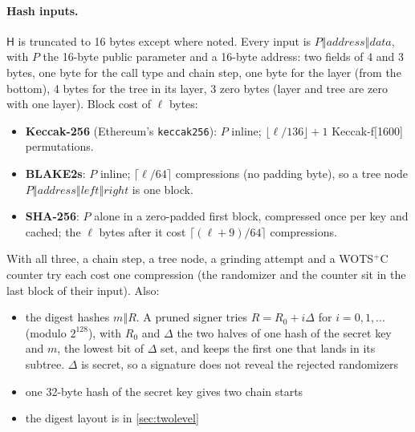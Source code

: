\documentclass[11pt]{article}
\newcommand{\hash}{\mathsf{H}}
\newcommand{\concat}{\mathbin\Vert}
\begin{document}
\paragraph{Hash inputs.} $\hash$ is truncated to 16 bytes except where noted. Every input is
$P \concat \mathit{address} \concat \mathit{data}$, with $P$ the 16-byte public parameter and a 16-byte address:
two fields of 4 and 3 bytes, one byte for the call type and chain step, one byte for the layer (from the bottom),
4 bytes for the tree in its layer, 3 zero bytes (layer and tree are zero with one layer). Block cost of $\ell$ bytes:
\begin{itemize}
  \item \textbf{Keccak-256} (Ethereum's \texttt{keccak256}): $P$ inline; $\lfloor\ell/136\rfloor+1$ Keccak-f[1600]
        permutations.
  \item \textbf{BLAKE2s}: $P$ inline; $\lceil\ell/64\rceil$ compressions (no padding byte), so a tree node
        $P\concat\mathit{address}\concat\mathit{left}\concat\mathit{right}$ is one block.
  \item \textbf{SHA-256}: $P$ alone in a zero-padded first block, compressed once per key and cached; the $\ell$ bytes
        after it cost $\lceil(\ell+9)/64\rceil$ compressions.
\end{itemize}
With all three, a chain step, a tree node, a grinding attempt and a WOTS$^+$C counter try each cost one compression
(the randomizer and the counter sit in the last block of their input). Also:
\begin{itemize}
  \item the digest hashes $m\concat R$. A pruned signer tries $R = R_0 + i\Delta$ for $i = 0, 1, \dots$ (modulo
        $2^{128}$), with $R_0$ and $\Delta$ the two halves of one hash of the secret key and $m$, the lowest bit of
        $\Delta$ set, and keeps the first one that lands in its subtree. $\Delta$ is secret, so a signature does not
        reveal the rejected randomizers
  \item one 32-byte hash of the secret key gives two chain starts
  \item the digest layout is in \cref{sec:twolevel}
\end{itemize}
\end{document}
